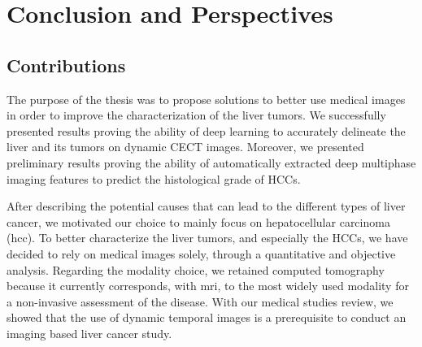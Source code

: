 \chapter*[Conclusion and Perspectives]{Conclusion and Perspectives}
\label{cha:Conclusion}

\section*{Contributions}
\label{sec:ConclusionContributions}

The purpose of the thesis was to propose solutions to better use medical images in order to improve the characterization of the liver tumors. We successfully presented results proving the ability of deep learning to accurately delineate the liver and its tumors on dynamic CECT images. Moreover, we presented preliminary results proving the ability of automatically extracted deep multiphase imaging features to predict the histological grade of HCCs.

After describing the potential causes that can lead to the different
types of liver cancer, we motivated our choice to mainly focus on
hepatocellular carcinoma (\ac{hcc}).
To better characterize the liver tumors, and especially the HCCs, we have decided to rely on medical images solely, through a quantitative and objective analysis.
Regarding the modality choice, we retained computed tomography
because it currently corresponds, with \ac{mri}, to the most widely used modality  for a non-invasive assessment of the disease.
With our medical studies review, we showed that the use of dynamic temporal images is a prerequisite to conduct an imaging based liver cancer study.


